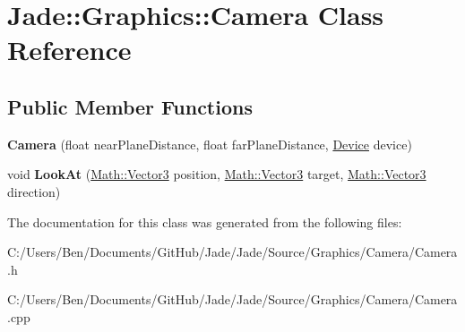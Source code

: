 \hypertarget{class_jade_1_1_graphics_1_1_camera}{}\section{Jade\+:\+:Graphics\+:\+:Camera Class Reference}
\label{class_jade_1_1_graphics_1_1_camera}
\subsection*{Public Member Functions}
\begin{DoxyCompactItemize}
\item 
\hypertarget{class_jade_1_1_graphics_1_1_camera_a33ef58c2d330faeaabd3bde724e5d67e}{}{\bfseries Camera} (float near\+Plane\+Distance, float far\+Plane\+Distance, \hyperlink{class_jade_1_1_graphics_1_1_device}{Device} device)\label{class_jade_1_1_graphics_1_1_camera_a33ef58c2d330faeaabd3bde724e5d67e}

\item 
\hypertarget{class_jade_1_1_graphics_1_1_camera_a2d1efb3b8364a7c8fd463979cbacef64}{}void {\bfseries Look\+At} (\hyperlink{struct_jade_1_1_math_1_1_vector3}{Math\+::\+Vector3} position, \hyperlink{struct_jade_1_1_math_1_1_vector3}{Math\+::\+Vector3} target, \hyperlink{struct_jade_1_1_math_1_1_vector3}{Math\+::\+Vector3} direction)\label{class_jade_1_1_graphics_1_1_camera_a2d1efb3b8364a7c8fd463979cbacef64}

\end{DoxyCompactItemize}


The documentation for this class was generated from the following files\+:\begin{DoxyCompactItemize}
\item 
C\+:/\+Users/\+Ben/\+Documents/\+Git\+Hub/\+Jade/\+Jade/\+Source/\+Graphics/\+Camera/Camera.\+h\item 
C\+:/\+Users/\+Ben/\+Documents/\+Git\+Hub/\+Jade/\+Jade/\+Source/\+Graphics/\+Camera/Camera.\+cpp\end{DoxyCompactItemize}
